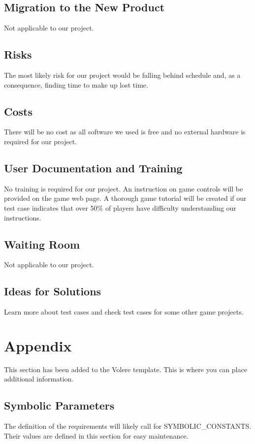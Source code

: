 \documentclass[12pt, titlepage]{article}
\begin{document}
\subsection{Migration to the New Product}
Not applicable to our project.

\subsection{Risks}
The most likely risk for our project would be falling behind schedule and, as a consequence, finding time to make up lost time. 

\subsection{Costs}
There will be no cost as all software we used is free and no external hardware is required for our project.

\subsection{User Documentation and Training}
No training is required for our project. An instruction on game controls will be provided on the game web page. A thorough game tutorial will be created if our test case indicates that over 50\% of players have difficulty understanding our instructions.

\subsection{Waiting Room}
Not applicable to our project.

\subsection{Ideas for Solutions}
Learn more about test cases and check test cases for some other game projects.





\newpage

\section{Appendix}

This section has been added to the Volere template.  This is where you can place
additional information.

\subsection{Symbolic Parameters}

The definition of the requirements will likely call for SYMBOLIC\_CONSTANTS.
Their values are defined in this section for easy maintenance. 
\end{document}
